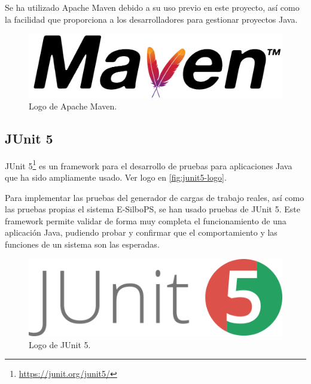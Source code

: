 Se ha utilizado Apache Maven debido a su uso previo en este proyecto, así como la
facilidad que proporciona a los desarrolladores para gestionar proyectos Java.

\begin{figure}[htpb]
    \centering
    \includegraphics[width=0.3\linewidth]{images/logos/maven-logo.png} 
    \caption{Logo de Apache Maven.}
    \label{fig:maven-logo}
\end{figure}


\subsection*{JUnit 5}

JUnit 5\footnote{\href{https://junit.org/junit5/}{https://junit.org/junit5/}} es un
framework para el desarrollo de pruebas para aplicaciones Java que ha sido ampliamente
usado. Ver logo en \autoref{fig:junit5-logo}.

Para implementar las pruebas del generador de cargas de trabajo reales, así como
las pruebas propias el sistema E-SilboPS, se han usado pruebas de JUnit 5.
Este framework permite validar de forma muy completa el funcionamiento de una
aplicación Java, pudiendo probar y confirmar que el comportamiento y las funciones
de un sistema son las esperadas.

\begin{figure}[htpb]
    \centering
    \includegraphics[width=0.3\linewidth]{images/logos/junit5-logo.png} 
    \caption{Logo de JUnit 5.}
    \label{fig:junit5-logo}
\end{figure}


